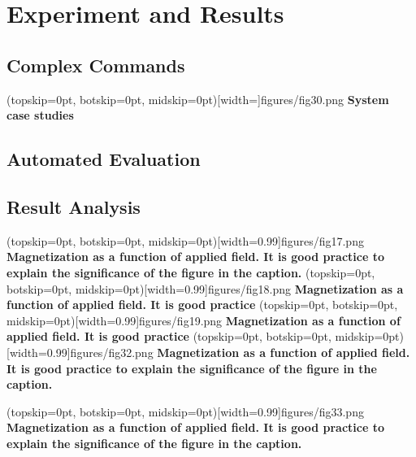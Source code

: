 \documentclass{ieeeaccess}
\begin{document}
\section{Experiment and Results}
\label{sec:guidelines}

\subsection{Complex Commands}
\Figure[t!](topskip=0pt, botskip=0pt,
midskip=0pt)[width=\textwidth]{{figures/fig30.png}}
{ \textbf{System case studies}\label{fig5}}


\subsection{Automated Evaluation}
\subsection{Result Analysis}
\Figure[t!](topskip=0pt, botskip=0pt,
midskip=0pt)[width=0.99\columnwidth]{{figures/fig17.png}}
{ \textbf{Magnetization as a function of applied field.
        It is good practice to explain the significance of the figure in the
        caption.}\label{fig6}}
\Figure[t!](topskip=0pt, botskip=0pt,
midskip=0pt)[width=0.99\columnwidth]{{figures/fig18.png}}
{ \textbf{Magnetization as a function of applied field.
        It is good practice}\label{fig7}}
\Figure[t!](topskip=0pt, botskip=0pt,
midskip=0pt)[width=0.99\columnwidth]{{figures/fig19.png}}
{ \textbf{Magnetization as a function of applied field.
        It is good practice}\label{fig8}}
\Figure[t!](topskip=0pt, botskip=0pt,
midskip=0pt)[width=0.99\columnwidth]{{figures/fig32.png}}
{ \textbf{Magnetization as a function of applied field.
        It is good practice to explain the significance of the figure in the
        caption.}\label{fig9}}

\Figure[t!](topskip=0pt, botskip=0pt,
midskip=0pt)[width=0.99\columnwidth]{{figures/fig33.png}}
{ \textbf{Magnetization as a function of applied field.
        It is good practice to explain the significance of the figure in the
        caption.}\label{fig10}}
\end{document}
